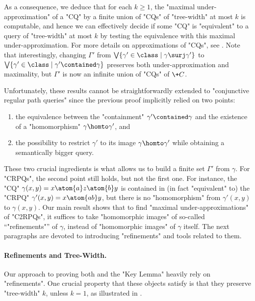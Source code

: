 As a consequence, we deduce that for each $k \geq 1$,
the "maximal under-approximation" of a "CQ" by
a finite union of "CQs" of "tree-width" at most $k$ is computable, and hence
we can effectively decide if some "CQ" is "equivalent" to a query of "tree-width" at
most $k$ by testing the equivalence with this maximal under-approximation.
For more details on approximations of "CQs", see \cite{BarceloLibkinRomero2014Efficient}.
Note that interestingly, changing $\Gamma'$ from
$\bigvee \{ \gamma' \in \class \mid \gamma \surj \gamma' \}$
to $\bigvee \{ \gamma' \in \class \mid \gamma' \contained \gamma \}$
preserves both under-approximation and maximality, but $\Gamma'$ is now an infinite
union of "CQs" of $\+C$.

Unfortunately, these results cannot be straightforwardly extended to "conjunctive regular
path queries" since the previous proof implicitly relied on two points:
\begin{enumerate}
	\item the equivalence between the
	"containment" $\gamma' \contained \gamma$ and the existence of a "homomorphism"
	$\gamma \homto \gamma'$, and
	\item the possibility to restrict $\gamma'$ to its image $\gamma \homto \gamma'$ while 
	obtaining a semantically bigger query.
\end{enumerate}
These two crucial ingredients is what allows us to build a finite set $\Gamma'$ from $\gamma$.
For "CRPQs", the second point still holds, but not the first one.
For instance, the "CQ" $\gamma(x,y) = x \atom{a} z \atom{b} y$ is
contained in (in fact "equivalent" to) the "CRPQ" $\gamma'(x,y) = x \atom{ab} y$,
but there is no "homomorphism" from $\gamma'(x,y)$ to $\gamma(x,y)$.
Our main result shows that to find "maximal under-approximations" of "C2RPQs",
it suffices to take "homomorphic images" of so-called ``"refinements"'' of $\gamma$,
instead of "homomorphic images" of $\gamma$ itself. The next paragraphs are devoted to
introducing "refinements" and tools related to them.

\paragraph*{Refinements and Tree-Width.}
Our approach to proving both 
and the "Key Lemma" heavily rely on "refinements". One crucial property
that these objects satisfy is that they preserve "tree-width" $k$, unless $k=1$,
as illustrated in .

